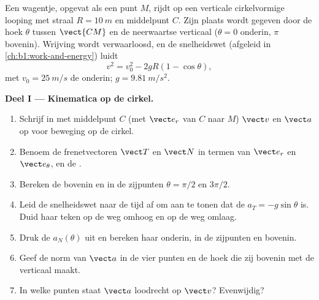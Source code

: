 \begin{problem}
\label{pb:b1:point-kinematics:1}
Een wagentje, opgevat als een punt $M$, rijdt op een verticale cirkelvormige looping met
straal $R = \qty{10}{m}$ en middelpunt $C$. Zijn plaats wordt gegeven door de
hoek $\theta$ tussen $\vect{CM}$ en de neerwaartse verticaal ($\theta =
0$ onderin, $\pi$ bovenin). Wrijving wordt verwaarloosd, en de
snelheidswet (afgeleid in \cref{ch:b1:work-and-energy}) luidt
\[
v^2 = v_0^2 - 2gR(1 - \cos\theta),
\]
met $v_0 = \qty{25}{m/s}$ de  onderin; $g = \qty{9.81}{m/s^2}$.

\medskip
\noindent\textbf{Deel I --- Kinematica op de cirkel.}
\begin{enumerate}
  \item Schrijf in  met middelpunt $C$ (met $\vect e_r$ van $C$
        naar $M$) $\vect v$ en $\vect a$ op voor beweging op de cirkel.
  \item Benoem de frenetvectoren $\vect T$ en $\vect N$ in termen van
        $\vect e_r$ en $\vect e_\theta$, en de .
  \item Bereken de  bovenin en in de zijpunten
        $\theta = \pi/2$ en $3\pi/2$.
  \item Leid de snelheidswet naar de tijd af om aan te tonen dat
        de  $a_T = -g\sin\theta$ is. Duid
        haar teken op de weg omhoog en op de weg omlaag.
  \item Druk de  $a_N(\theta)$ uit en bereken haar
        onderin, in de zijpunten en bovenin.
  \item Geef de norm van $\vect a$ in de vier punten en de hoek die zij
        bovenin met de verticaal maakt.
  \item In welke punten staat $\vect a$ loodrecht op $\vect v$? Evenwijdig?
\end{enumerate}


\end{problem}
